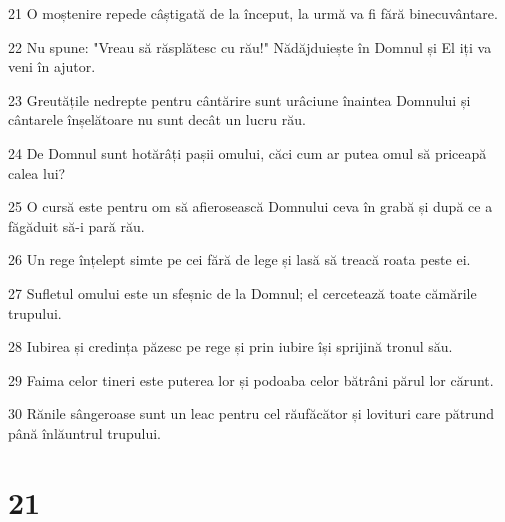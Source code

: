 \par 21 O moștenire repede câștigată de la început, la urmă va fi fără binecuvântare.
\par 22 Nu spune: "Vreau să răsplătesc cu rău!" Nădăjduiește în Domnul și El iți va veni în ajutor.
\par 23 Greutățile nedrepte pentru cântărire sunt urâciune înaintea Domnului și cântarele înșelătoare nu sunt decât un lucru rău.
\par 24 De Domnul sunt hotărâți pașii omului, căci cum ar putea omul să priceapă calea lui?
\par 25 O cursă este pentru om să afierosească Domnului ceva în grabă și după ce a făgăduit să-i pară rău.
\par 26 Un rege înțelept simte pe cei fără de lege și lasă să treacă roata peste ei.
\par 27 Sufletul omului este un sfeșnic de la Domnul; el cercetează toate cămările trupului.
\par 28 Iubirea și credința păzesc pe rege și prin iubire își sprijină tronul său.
\par 29 Faima celor tineri este puterea lor și podoaba celor bătrâni părul lor cărunt.
\par 30 Rănile sângeroase sunt un leac pentru cel răufăcător și lovituri care pătrund până înlăuntrul trupului.

\chapter{21}

